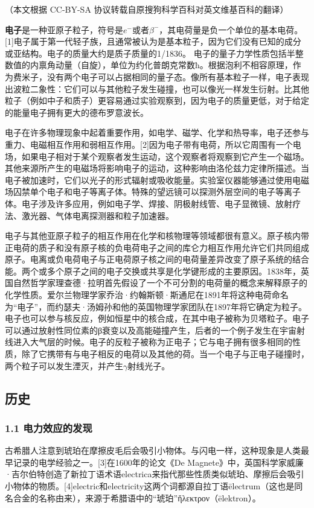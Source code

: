 
（本文根据 CC-BY-SA 协议转载自原搜狗科学百科对英文维基百科的翻译）

\textbf{电子}是一种亚原子粒子，符号是$e^-$或者$\beta^-$，其电荷量是负一个单位的基本电荷。[1]电子属于第一代轻子族，且通常被认为是基本粒子，因为它们没有已知的成分或亚结构。电子的质量大约是质子质量的1/1836。 电子的量子力学性质包括半整数值的内禀角动量（自旋），单位为约化普朗克常数ħ。根据泡利不相容原理，作为费米子，没有两个电子可以占据相同的量子态。像所有基本粒子一样，电子表现出波粒二象性：它们可以与其他粒子发生碰撞，也可以像光一样发生衍射。比其他粒子（例如中子和质子）更容易通过实验观察到，因为电子的质量更低，对于给定的能量电子拥有更大的德布罗意波长。

电子在许多物理现象中起着重要作用，如电学、磁学、化学和热导率，电子还参与重力、电磁相互作用和弱相互作用。[2]因为电子带有电荷，所以它周围有一个电场，如果电子相对于某个观察者发生运动，这个观察者将观察到它产生一个磁场。其他来源所产生的电磁场将影响电子的运动，这种影响由洛伦兹力定律所描述。当电子被加速时，它们以光子的形式辐射或吸收能量。实验室仪器能够通过使用电磁场囚禁单个电子和电子等离子体。特殊的望远镜可以探测外层空间的电子等离子体。电子涉及许多应用，例如电子学、焊接、阴极射线管、电子显微镜、放射疗法、激光器、气体电离探测器和粒子加速器。

电子与其他亚原子粒子的相互作用在化学和核物理等领域都很有意义。原子核内带正电荷的质子和没有原子核的负电荷电子之间的库仑力相互作用允许它们共同组成原子。电离或负电荷电子与正电荷原子核之间的电荷量差异改变了原子系统的结合能。两个或多个原子之间的电子交换或共享是化学键形成的主要原因。1838年，英国自然哲学家理查德·拉明首先假设了一个不可分割的电荷量的概念来解释原子的化学性质。爱尔兰物理学家乔治·约翰斯顿·斯通尼在1891年将这种电荷命名为“电子”，而约瑟夫·汤姆孙和他的英国物理学家团队在1897年将它确定为粒子。电子也可以参与核反应，例如恒星中的核合成，在其中电子被称为贝塔粒子。电子可以通过放射性同位素的β衰变以及高能碰撞产生，后者的一个例子发生在宇宙射线进入大气层的时候。电子的反粒子被称为正电子；它与电子拥有很多相同的性质，除了它携带有与电子相反的电荷以及其他的荷。当一个电子与正电子碰撞时，两个粒子可以发生湮灭，并产生$\gamma$射线光子。

\subsection{历史}
\subsubsection{1.1 电力效应的发现}
古希腊人注意到琥珀在摩擦皮毛后会吸引小物体。与闪电一样，这种现象是人类最早记录的电学经验之一。[3]在1600年的论文《De Magnete》中，英国科学家威廉·吉尔伯特创造了新拉丁语术语electrica来指代那些性质类似琥珀、摩擦后会吸引小物体的物质。[4]electric和electricity这两个词都源自拉丁语ēlectrum（这也是同名合金的名称由来），来源于希腊语中的“琥珀”ἤλεκτρον（ēlektron）。
